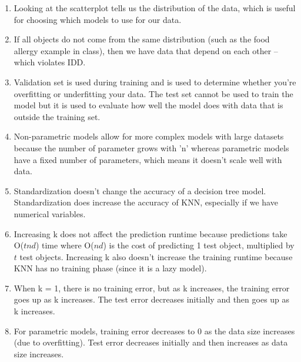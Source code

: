 \documentclass{article}
\def\enum#1{\begin{enumerate}#1\end{enumerate}}
\begin{document}
\enum{
\item Looking at the scatterplot tells us the distribution of the data, which is useful for choosing which models to use for our data. 
\item If all objects do not come from the same distribution (such as the food allergy example in class), then we have data that depend on each other -- which violates IDD. 
\item Validation set is used during training and is used to determine whether you're overfitting or underfitting your data. The test set cannot be used to train the model but it is used to evaluate how well the model does with data that is outside the training set.  
\item Non-parametric models allow for more complex models with large datasets because the number of parameter grows with 'n' whereas parametric models have a fixed number of parameters, which means it doesn't scale well with data. 
\item Standardization doesn't change the accuracy of a decision tree model. Standardization does increase the accuracy of KNN, especially if we have numerical variables.
\item Increasing k does not affect the prediction runtime because predictions take O($tnd$) time where O($nd$) is the cost of predicting 1 test object, multiplied by $t$ test objects. Increasing k also doesn't increase the training runtime because KNN has no training phase (since it is a lazy model). 
\item When k = 1, there is no training error, but as k increases, the training error goes up as k increases. The test error decreases initially and then goes up as k increases.
\item For parametric models, training error decreases to 0 as the data size increases (due to overfitting). Test error decreases initially and then increases as data size increases. 
}
\end{document}
